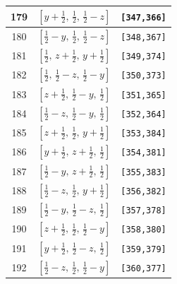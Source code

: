 \documentclass[fleqn,8pt]{jsarticle}
\begin{document}
\begin{longtable}{ccc}
179 & $\left[ y + \frac{1}{2},\, \frac{1}{2},\, \frac{1}{2} - z \right]$ & {\tt [347,366]} \\ \hline
180 & $\left[ \frac{1}{2} - y,\, \frac{1}{2},\, \frac{1}{2} - z \right]$ & {\tt [348,367]} \\ \hline
181 & $\left[ \frac{1}{2},\, z + \frac{1}{2},\, y + \frac{1}{2} \right]$ & {\tt [349,374]} \\ \hline
182 & $\left[ \frac{1}{2},\, \frac{1}{2} - z,\, \frac{1}{2} - y \right]$ & {\tt [350,373]} \\ \hline
183 & $\left[ z + \frac{1}{2},\, \frac{1}{2} - y,\, \frac{1}{2} \right]$ & {\tt [351,365]} \\ \hline
184 & $\left[ \frac{1}{2} - z,\, \frac{1}{2} - y,\, \frac{1}{2} \right]$ & {\tt [352,364]} \\ \hline
185 & $\left[ z + \frac{1}{2},\, \frac{1}{2},\, y + \frac{1}{2} \right]$ & {\tt [353,384]} \\ \hline
186 & $\left[ y + \frac{1}{2},\, z + \frac{1}{2},\, \frac{1}{2} \right]$ & {\tt [354,381]} \\ \hline
187 & $\left[ \frac{1}{2} - y,\, z + \frac{1}{2},\, \frac{1}{2} \right]$ & {\tt [355,383]} \\ \hline
188 & $\left[ \frac{1}{2} - z,\, \frac{1}{2},\, y + \frac{1}{2} \right]$ & {\tt [356,382]} \\ \hline
189 & $\left[ \frac{1}{2} - y,\, \frac{1}{2} - z,\, \frac{1}{2} \right]$ & {\tt [357,378]} \\ \hline
190 & $\left[ z + \frac{1}{2},\, \frac{1}{2},\, \frac{1}{2} - y \right]$ & {\tt [358,380]} \\ \hline
191 & $\left[ y + \frac{1}{2},\, \frac{1}{2} - z,\, \frac{1}{2} \right]$ & {\tt [359,379]} \\ \hline
192 & $\left[ \frac{1}{2} - z,\, \frac{1}{2},\, \frac{1}{2} - y \right]$ & {\tt [360,377]} \\
\end{longtable}
\renewcommand{\arraystretch}{1.2}
\end{document}

